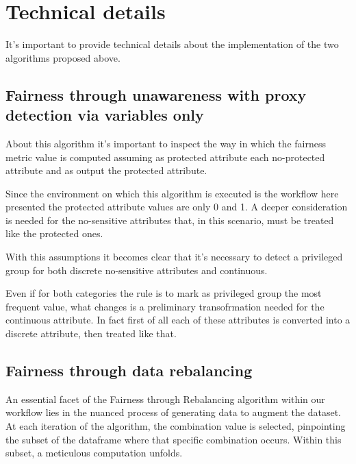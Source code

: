 \documentclass[12pt,a4paper,openright,twoside]{book}
\begin{document}
\chapter{Technical details}
\label{chap:technicals}

It's important to provide technical details about the implementation of the two algorithms proposed above.

\section{Fairness through unawareness with proxy detection via variables only}

About this algorithm it's important to inspect the way in which the fairness metric value is computed assuming as protected attribute each no-protected attribute and as output the protected attribute.

Since the environment on which this algorithm is executed is the workflow here presented the protected attribute values are only 0 and 1. A deeper consideration is needed for the no-sensitive attributes that, in this scenario, must be treated like the protected ones.

With this assumptions it becomes clear that it's necessary to detect a privileged group for both discrete no-sensitive attributes and continuous.

Even if for both categories the rule is to mark as privileged group the most frequent value, what changes is a preliminary transofrmation needed for the continuous attribute. In fact first of all each of these attributes is converted into a discrete attribute, then treated like that.




\section{Fairness through data rebalancing}


An essential facet of the Fairness through Rebalancing algorithm within our workflow lies in the nuanced process of generating data to augment the dataset. At each iteration of the algorithm, the combination value is selected, pinpointing the subset of the dataframe where that specific combination occurs. Within this subset, a meticulous computation unfolds.


\end{document}

